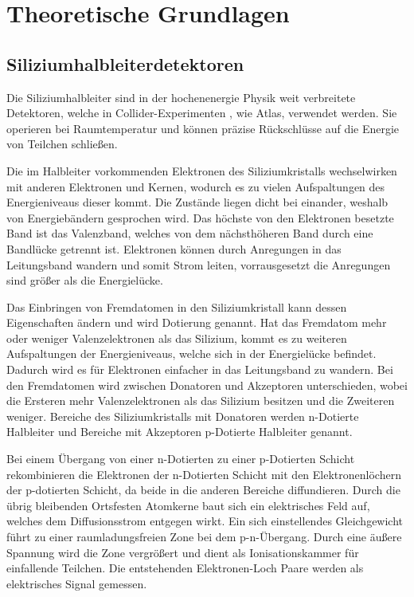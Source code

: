 \chapter{Theoretische Grundlagen}


\section{Siliziumhalbleiterdetektoren}

Die Siliziumhalbleiter sind in der hochenenergie Physik weit verbreitete
Detektoren, welche in Collider-Experimenten , wie Atlas, verwendet werden.
Sie operieren bei Raumtemperatur und können präzise Rückschlüsse auf die
Energie von Teilchen schließen.


Die im Halbleiter vorkommenden Elektronen des Siliziumkristalls wechselwirken mit anderen Elektronen und
Kernen, wodurch es zu vielen Aufspaltungen des Energieniveaus dieser kommt. Die
Zustände liegen dicht bei einander, weshalb von Energiebändern gesprochen wird.
Das höchste von den Elektronen besetzte Band ist das Valenzband, welches von dem
nächsthöheren Band durch eine Bandlücke getrennt ist. Elektronen können
durch Anregungen in das Leitungsband wandern und somit Strom leiten, vorrausgesetzt
die Anregungen sind größer als die Energielücke.

Das Einbringen von Fremdatomen in den Siliziumkristall kann dessen Eigenschaften ändern
und wird Dotierung genannt.
Hat das Fremdatom mehr oder weniger Valenzelektronen als das Silizium, kommt
es zu weiteren Aufspaltungen der Energieniveaus, welche sich in der Energielücke
befindet. Dadurch wird es für Elektronen einfacher in das Leitungsband zu wandern.
Bei den Fremdatomen wird zwischen Donatoren und Akzeptoren unterschieden, wobei die
Ersteren mehr Valenzelektronen als das Silizium besitzen und die Zweiteren weniger.
Bereiche des Siliziumkristalls mit Donatoren werden n-Dotierte Halbleiter
und Bereiche mit Akzeptoren p-Dotierte Halbleiter genannt.

Bei einem Übergang von einer n-Dotierten zu einer p-Dotierten Schicht rekombinieren
die Elektronen der n-Dotierten Schicht mit den Elektronenlöchern der p-dotierten Schicht, da beide
in die anderen Bereiche diffundieren. Durch die übrig bleibenden Ortsfesten Atomkerne
baut sich ein elektrisches Feld auf, welches dem Diffusionsstrom entgegen wirkt.
Ein sich einstellendes Gleichgewicht führt zu einer raumladungsfreien Zone bei
dem p-n-Übergang.
Durch eine äußere Spannung wird die Zone vergrößert und dient als Ionisationskammer für einfallende Teilchen.
Die entstehenden Elektronen-Loch Paare werden als elektrisches Signal gemessen.

